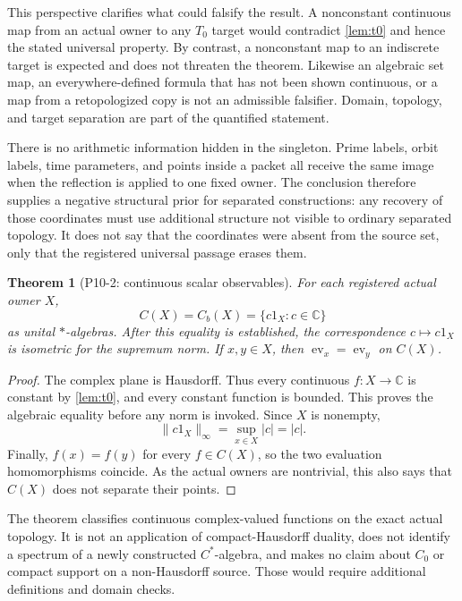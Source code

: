 \documentclass[11pt]{article}
\newtheorem{theorem}{Theorem}[section]
\theoremstyle{definition}
\newcommand{\C}{\mathbb C}
\begin{document}
This perspective clarifies what could falsify the result.  A nonconstant continuous map from an actual owner to any $T_0$ target would contradict \cref{lem:t0} and hence the stated universal property.  By contrast, a nonconstant map to an indiscrete target is expected and does not threaten the theorem.  Likewise an algebraic set map, an everywhere-defined formula that has not been shown continuous, or a map from a retopologized copy is not an admissible falsifier.  Domain, topology, and target separation are part of the quantified statement.

There is no arithmetic information hidden in the singleton.  Prime labels, orbit labels, time parameters, and points inside a packet all receive the same image when the reflection is applied to one fixed owner.  The conclusion therefore supplies a negative structural prior for separated constructions: any recovery of those coordinates must use additional structure not visible to ordinary separated topology.  It does not say that the coordinates were absent from the source set, only that the registered universal passage erases them.

\begin{theorem}[P10-2: continuous scalar observables]
\label{thm:scalar}
For each registered actual owner $X$,
\[
 C(X)=C_b(X)=\{c1_X:c\in\C\}
\]
as unital $*$-algebras.  After this equality is established, the correspondence $c\mapsto c1_X$ is isometric for the supremum norm.  If $x,y\in X$, then $\operatorname{ev}_x=\operatorname{ev}_y$ on $C(X)$.
\end{theorem}

\begin{proof}
The complex plane is Hausdorff.  Thus every continuous $f:X\to\C$ is constant by \cref{lem:t0}, and every constant function is bounded.  This proves the algebraic equality before any norm is invoked.  Since $X$ is nonempty,
\[
 \lVert c1_X\rVert_\infty=\sup_{x\in X}|c|=|c|.
\]
Finally, $f(x)=f(y)$ for every $f\in C(X)$, so the two evaluation homomorphisms coincide.  As the actual owners are nontrivial, this also says that $C(X)$ does not separate their points.
\end{proof}

The theorem classifies continuous complex-valued functions on the exact actual topology.  It is not an application of compact-Hausdorff duality, does not identify a spectrum of a newly constructed $C^*$-algebra, and makes no claim about $C_0$ or compact support on a non-Hausdorff source.  Those would require additional definitions and domain checks.
\end{document}
